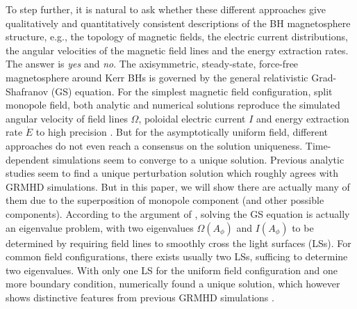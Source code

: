 \documentclass[iop,apj]{emulateapj}
\begin{document}
To step further, it is natural to ask whether
these different approaches give qualitatively and quantitatively consistent
descriptions of the BH magnetosphere structure, e.g.,
the topology of magnetic fields, the electric current distributions,
the angular velocities of the magnetic field lines
and the energy extraction rates. The answer is {\em yes} and {\em no}. The axisymmetric, steady-state,
force-free magnetosphere around  Kerr BHs is governed by the
general relativistic Grad-Shafranov (GS) equation. For
the simplest magnetic field configuration, split monopole
field, both analytic \citep{Pan2015b} and numerical solutions \citep{Nathanail2014}
reproduce the simulated angular velocity of field lines $\Omega$,
poloidal electric current $I$ and energy extraction rate $\dot E$ to high precision
\citep{Tchekhovskoy2010}. But for the asymptotically
uniform field, different approaches do not even reach a consensus on the solution uniqueness.
Time-dependent simulations \citep[e.g.][]{Komissarov2005, Komissarov2007, Yang2015} seem to converge to
a unique solution. Previous analytic studies \citep{Beskin2013, Pan2014, Gralla2016a} seem to find a unique
perturbation solution which roughly agrees with GRMHD simulations.
But in this paper, we will show there are actually many of them
due to the superposition of monopole component (and other possible components).
According to the argument of \citet{Nathanail2014},
solving the GS equation is actually an eigenvalue
problem, with two eigenvalues $\Omega(A_\phi)$ and $I(A_\phi)$ to be determined
by requiring field lines to smoothly cross the light surfaces (LSs).
For common field configurations, there exists usually two LSs, sufficing to determine two eigenvalues.
With only one LS for the uniform field configuration and one more boundary condition,
\citet{Nathanail2014} numerically found a unique solution, which however shows distinctive features from
previous GRMHD simulations \citep{Komissarov2005}.
\end{document}
